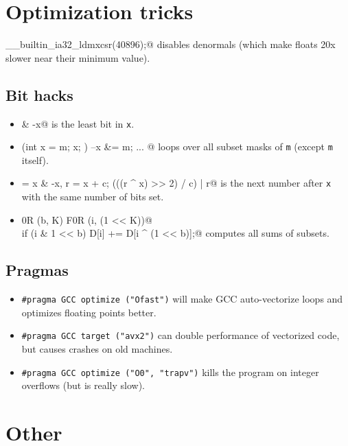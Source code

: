 \section{Optimization tricks}
	\verb@__builtin_ia32_ldmxcsr(40896);@ disables denormals (which make floats 20x slower near their minimum value).
	\subsection{Bit hacks}
		\begin{itemize}
			\item \verb@x & -x@ is the least bit in \texttt{x}.
			\item \verb@for (int x = m; x; ) { --x &= m; ... }@ loops over all subset masks of \texttt{m} (except \texttt{m} itself).
			\item \verb@c = x & -x, r = x + c; (((r ^ x) >> 2) / c) | r@ is the next number after \texttt{x} with the same number of bits set.
			\item \verb@F0R (b, K) F0R (i, (1 << K))@ \\ \verb@  if (i & 1 << b) D[i] += D[i ^ (1 << b)];@ computes all sums of subsets.
		\end{itemize}
	\subsection{Pragmas}
		\begin{itemize}
			\item \lstinline{#pragma GCC optimize ("Ofast")} will make GCC auto-vectorize loops and optimizes floating points better.
			\item \lstinline{#pragma GCC target ("avx2")} can double performance of vectorized code, but causes crashes on old machines.
			\item \lstinline{#pragma GCC optimize ("O0", "trapv")} kills the program on integer overflows (but is really slow).
		\end{itemize}

\section{Other}
